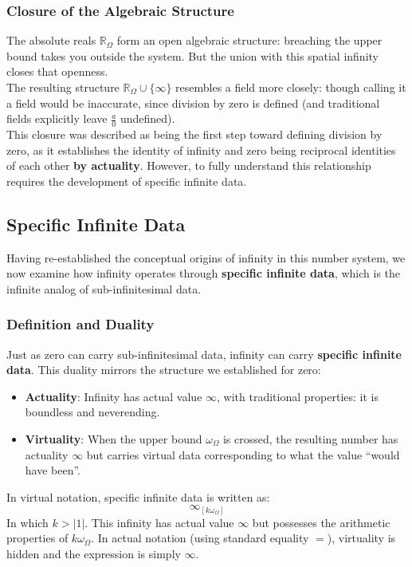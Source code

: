 \documentclass{article}
\begin{document}
\subsubsection{Closure of the Algebraic Structure}

The absolute reals $\mathbb{R}_\Omega$ form an open algebraic structure: breaching the upper bound takes you outside the system. But the union with this spatial infinity closes that openness.
\\The resulting structure $\mathbb{R}_\Omega \cup \{\infty\}$ resembles a field more closely: though calling it a field would be inaccurate, since division by zero is defined (and traditional fields explicitly leave $\frac{a}{0}$ undefined).
\\This closure was described as being the first step toward defining division by zero, as it establishes the identity of infinity and zero being reciprocal identities of each other \textbf{by actuality}. However, to fully understand this relationship requires the development of specific infinite data.

\subsection{Specific Infinite Data}

Having re-established the conceptual origins of infinity in this number system, we now examine how infinity operates through \textbf{specific infinite data}, which is the infinite analog of sub-infinitesimal data.

\subsubsection{Definition and Duality}

Just as zero can carry sub-infinitesimal data, infinity can carry \textbf{specific infinite data}. This duality mirrors the structure we established for zero:

\begin{itemize}
\item \textbf{Actuality}: Infinity has actual value $\infty$, with traditional properties: it is boundless and neverending.
\item \textbf{Virtuality}: When the upper bound $\omega_\Omega$ is crossed, the resulting number has actuality $\infty$ but carries virtual data corresponding to what the value ``would have been''.
\end{itemize}

In virtual notation, specific infinite data is written as:
$$\infty_{[k\omega_\Omega]}$$In which $k>|1|$. This infinity has actual value $\infty$ but possesses the arithmetic properties of $k\omega_\Omega$. In actual notation (using standard equality $=$), virtuality is hidden and the expression is simply $\infty$.
\end{document}
